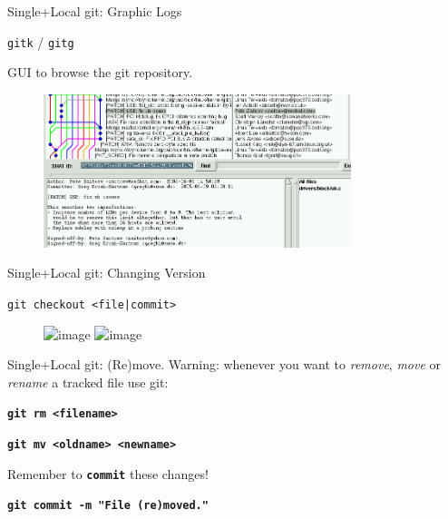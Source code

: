 \documentclass{beamer}
\newcommand{\git}{git\xspace}
\begin{document}
\begin{frame}{Single+Local \git: Graphic Logs}
  \begin{center}
    \texttt{gitk} / \texttt{gitg}
  \end{center}
  GUI to browse the \git repository.
  \begin{figure}
    \centering
    \includegraphics[width=0.8\textwidth]{figs/gitk_cropped}
  \end{figure}
\end{frame}


\begin{frame}{Single+Local \git: Changing Version}
  \begin{center}
    \texttt{git checkout <file|commit>}
  \end{center}
  
  \begin{figure}
    \centering
    \includegraphics<1>[width=0.75\textwidth]{own_fig/local-checkout-file}
    \includegraphics<2>[width=0.75\textwidth]{own_fig/local-checkout-commit}
  \end{figure}
\end{frame}


\begin{frame}{Single+Local \git: (Re)move.}
  \alert{Warning}: whenever you want to \emph{remove}, \emph{move} or
  \emph{rename} a tracked file use \git:
  \begin{center}
    \texttt{\textbf{git rm <filename>}}
  \end{center}
  \begin{center}
    \texttt{\textbf{git mv <oldname> <newname>}}
  \end{center}
Remember to \texttt{\textbf{commit}} these changes!
  \begin{center}
    \texttt{\textbf{git commit -m "File (re)moved."}}
  \end{center}
\end{frame}
\end{document}
